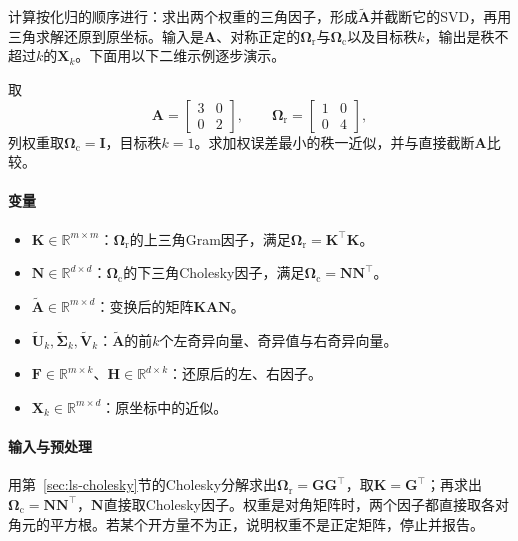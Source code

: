 计算按化归的顺序进行：求出两个权重的三角因子，形成$\widetilde{\bm A}$并截断它的SVD，再用三角求解还原到原坐标。输入是$\bm A$、对称正定的$\bm\Omega_{\mathrm r}$与$\bm\Omega_{\mathrm c}$以及目标秩$k$，输出是秩不超过$k$的$\bm X_k$。下面用以下二维示例逐步演示。

\begin{example}[行加权改变保留的方向]
\label{ex:matrix-approximation-weighted-low-rank}
取
\[
 \bm A=\begin{bmatrix}3&0\\0&2\end{bmatrix},\qquad
 \bm\Omega_{\mathrm r}=\begin{bmatrix}1&0\\0&4\end{bmatrix},
\]
列权重取$\bm\Omega_{\mathrm c}=\bm I$，目标秩$k=1$。求加权误差最小的秩一近似，并与直接截断$\bm A$比较。
\end{example}

\paragraph{变量}
\begin{itemize}
 \item $\bm K\in\mathbb R^{m\times m}$：$\bm\Omega_{\mathrm r}$的上三角Gram因子，满足$\bm\Omega_{\mathrm r}=\bm K^\top\bm K$。
 \item $\bm N\in\mathbb R^{d\times d}$：$\bm\Omega_{\mathrm c}$的下三角Cholesky因子，满足$\bm\Omega_{\mathrm c}=\bm N\bm N^\top$。
 \item $\widetilde{\bm A}\in\mathbb R^{m\times d}$：变换后的矩阵$\bm K\bm A\bm N$。
 \item $\widetilde{\bm U}_k,\widetilde{\bm\Sigma}_k,\widetilde{\bm V}_k$：$\widetilde{\bm A}$的前$k$个左奇异向量、奇异值与右奇异向量。
 \item $\bm F\in\mathbb R^{m\times k}$、$\bm H\in\mathbb R^{d\times k}$：还原后的左、右因子。
 \item $\bm X_k\in\mathbb R^{m\times d}$：原坐标中的近似。
\end{itemize}

\paragraph{输入与预处理}
用第~\ref{sec:ls-cholesky}节的Cholesky分解求出$\bm\Omega_{\mathrm r}=\bm G\bm G^\top$，取$\bm K=\bm G^\top$；再求出$\bm\Omega_{\mathrm c}=\bm N\bm N^\top$，$\bm N$直接取Cholesky因子。权重是对角矩阵时，两个因子都直接取各对角元的平方根。若某个开方量不为正，说明权重不是正定矩阵，停止并报告。

